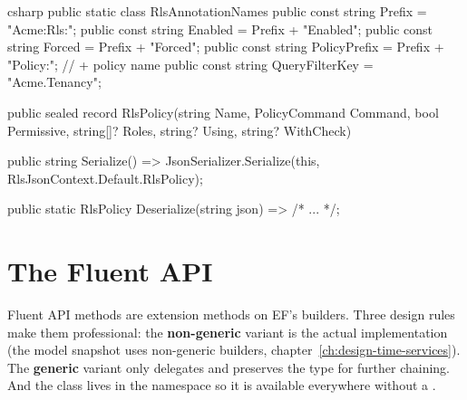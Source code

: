 \begin{sourcecode}{csharp}
public static class RlsAnnotationNames
{
    public const string Prefix = "Acme:Rls:";
    public const string Enabled = Prefix + "Enabled";
    public const string Forced = Prefix + "Forced";
    public const string PolicyPrefix = Prefix + "Policy:";     // + policy name
    public const string QueryFilterKey = "Acme.Tenancy";
}

public sealed record RlsPolicy(string Name, PolicyCommand Command, bool Permissive,
    string[]? Roles, string? Using, string? WithCheck)
{
    public string Serialize()
        => JsonSerializer.Serialize(this, RlsJsonContext.Default.RlsPolicy);

    public static RlsPolicy Deserialize(string json) => /* ... */;
}
\end{sourcecode}

\section{The Fluent API}

Fluent API methods are extension methods on EF's builders. Three design rules make them
professional: the \textbf{non-generic} variant is the actual implementation (the model
snapshot uses non-generic builders, chapter~\ref{ch:design-time-services}). The
\textbf{generic} variant only delegates and preserves the type for further chaining. And the
class lives in the namespace
 so it is
available everywhere without a .

